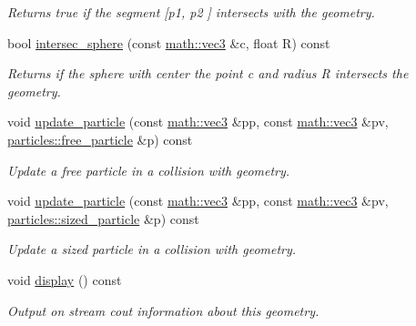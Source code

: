 \begin{DoxyCompactItemize}
\begin{DoxyCompactList}\small\item\em Returns true if the segment \mbox{[}{\itshape p1}, {\itshape p2} \mbox{]} intersects with the geometry. \end{DoxyCompactList}\item 
bool \hyperlink{classphysim_1_1geometric_1_1plane_a1f4ba9f73933f56201339789e37f7ff7}{intersec\+\_\+sphere} (const \hyperlink{structphysim_1_1math_1_1vec3}{math\+::vec3} \&c, float R) const
\begin{DoxyCompactList}\small\item\em Returns if the sphere with center the point {\itshape c} and radius {\itshape R} intersects the geometry. \end{DoxyCompactList}\item 
void \hyperlink{classphysim_1_1geometric_1_1plane_a9dc212ff39713d1525550c0bf328fe3a}{update\+\_\+particle} (const \hyperlink{structphysim_1_1math_1_1vec3}{math\+::vec3} \&pp, const \hyperlink{structphysim_1_1math_1_1vec3}{math\+::vec3} \&pv, \hyperlink{classphysim_1_1particles_1_1free__particle}{particles\+::free\+\_\+particle} \&p) const
\begin{DoxyCompactList}\small\item\em Update a free particle in a collision with geometry. \end{DoxyCompactList}\item 
void \hyperlink{classphysim_1_1geometric_1_1plane_aff9bd840500b32eeefb89ac0a7d9b95f}{update\+\_\+particle} (const \hyperlink{structphysim_1_1math_1_1vec3}{math\+::vec3} \&pp, const \hyperlink{structphysim_1_1math_1_1vec3}{math\+::vec3} \&pv, \hyperlink{classphysim_1_1particles_1_1sized__particle}{particles\+::sized\+\_\+particle} \&p) const
\begin{DoxyCompactList}\small\item\em Update a sized particle in a collision with geometry. \end{DoxyCompactList}\item 
\mbox{\label{classphysim_1_1geometric_1_1plane_a97242bc1446bdfc8fa02f12494249f1e}} 
void \hyperlink{classphysim_1_1geometric_1_1plane_a97242bc1446bdfc8fa02f12494249f1e}{display} () const
\begin{DoxyCompactList}\small\item\em Output on stream {\itshape cout} information about this geometry. \end{DoxyCompactList}\end{DoxyCompactItemize}
